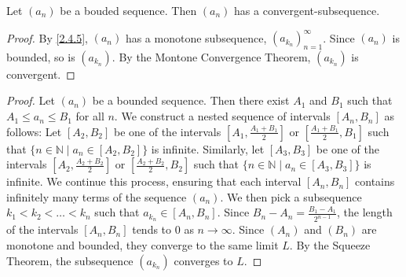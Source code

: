 \documentclass[11pt]{article}
\begin{document}
\begin{theorem}\label{2.4.6}
Let \((a_n)\) be a bouded sequence. Then \((a_n)\) has a convergent-subsequence.
\end{theorem}
\begin{proof}
    By \cref{2.4.5}, \((a_n)\) has a monotone subsequence, \((a_{k_n})_{n=1}^\infty\). Since \((a_n)\) is bounded, so is \((a_{k_n})\). By the Montone Convergence Theorem, \((a_{k_n})\) is convergent.
\end{proof}
\begin{proof}
    Let $(a_n)$ be a bounded sequence. Then there exist $A_1$ and $B_1$ such that $A_1 \leq a_n \leq B_1$ for all $n$. We construct a nested sequence of intervals $[A_n, B_n]$ as follows: Let $[A_2, B_2]$ be one of the intervals $[A_1, \frac{A_1 + B_1}{2}]$ or $[\frac{A_1 + B_1}{2}, B_1]$ such that $\{n \in \mathbb{N} \mid a_n \in [A_2, B_2]\}$ is infinite. Similarly, let $[A_3, B_3]$ be one of the intervals $[A_2, \frac{A_2 + B_2}{2}]$ or $[\frac{A_2 + B_2}{2}, B_2]$ such that $\{n \in \mathbb{N} \mid a_n \in [A_3, B_3]\}$ is infinite. We continue this process, ensuring that each interval $[A_n, B_n]$ contains infinitely many terms of the sequence $(a_n)$. We then pick a subsequence $k_1 < k_2 < \ldots < k_n$ such that $a_{k_n} \in [A_n, B_n]$. Since $B_n - A_n = \frac{B_1 - A_1}{2^{n-1}}$, the length of the intervals $[A_n, B_n]$ tends to $0$ as $n \to \infty$. Since $(A_n)$ and $(B_n)$ are monotone and bounded, they converge to the same limit $L$. By the Squeeze Theorem, the subsequence $(a_{k_n})$ converges to $L$.
\end{proof}
\end{document}
